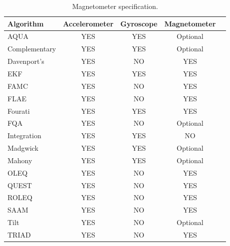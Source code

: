 \begin{table}
    \begin{center}
        \begin{tabular}[t]{lcccc}
            \hline
            Algorithm     & Accelerometer & Gyroscope & Magnetometer \\
            \hline
            AQUA          & YES           & YES       & Optional     \\
            Complementary & YES           & YES       & Optional     \\
            Davenport’s   & YES           & NO        & YES          \\
            EKF           & YES           & YES       & YES          \\
            FAMC          & YES           & NO        & YES          \\
            FLAE          & YES           & NO        & YES          \\
            Fourati       & YES           & YES       & YES          \\
            FQA           & YES           & NO        & Optional     \\
            Integration   & YES           & YES       & NO           \\
            Madgwick      & YES           & YES       & Optional     \\
            Mahony        & YES           & YES       & Optional     \\
            OLEQ          & YES           & NO        & YES          \\
            QUEST         & YES           & NO        & YES          \\
            ROLEQ         & YES           & NO        & YES          \\
            SAAM          & YES           & NO        & YES          \\
            Tilt          & YES           & NO        & Optional     \\
            TRIAD         & YES           & NO        & YES          \\
            \hline
        \end{tabular}
        \caption{Magnetometer specification. }
        \label{tab:magnetometer_specification}
    \end{center}
\end{table}

